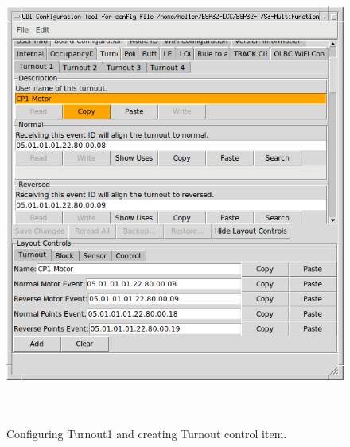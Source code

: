 \documentclass[12pt,twoside]{article}
\begin{document}
\begin{figure}[hbpt]\begin{centering}%
\includegraphics[height=6in]{ExampleSidingCP1-ConfigTurnout1.png}
\caption{Configuring Turnout1 and creating Turnout  control item.}
\label{fig:ExampleSidingCP1-ConfigTurnout1}
\end{centering}\end{figure}
\end{document}

